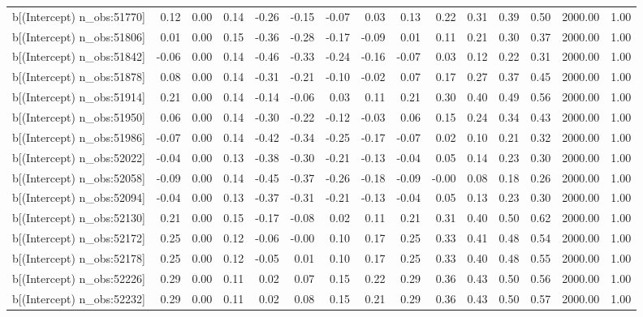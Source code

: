 \begin{table}[ht]
\begin{tabular}{rrrrrrrrrrrrrrr}
  b[(Intercept) n\_obs:51770] & 0.12 & 0.00 & 0.14 & -0.26 & -0.15 & -0.07 & 0.03 & 0.13 & 0.22 & 0.31 & 0.39 & 0.50 & 2000.00 & 1.00 \\ 
  b[(Intercept) n\_obs:51806] & 0.01 & 0.00 & 0.15 & -0.36 & -0.28 & -0.17 & -0.09 & 0.01 & 0.11 & 0.21 & 0.30 & 0.37 & 2000.00 & 1.00 \\ 
  b[(Intercept) n\_obs:51842] & -0.06 & 0.00 & 0.14 & -0.46 & -0.33 & -0.24 & -0.16 & -0.07 & 0.03 & 0.12 & 0.22 & 0.31 & 2000.00 & 1.00 \\ 
  b[(Intercept) n\_obs:51878] & 0.08 & 0.00 & 0.14 & -0.31 & -0.21 & -0.10 & -0.02 & 0.07 & 0.17 & 0.27 & 0.37 & 0.45 & 2000.00 & 1.00 \\ 
  b[(Intercept) n\_obs:51914] & 0.21 & 0.00 & 0.14 & -0.14 & -0.06 & 0.03 & 0.11 & 0.21 & 0.30 & 0.40 & 0.49 & 0.56 & 2000.00 & 1.00 \\ 
  b[(Intercept) n\_obs:51950] & 0.06 & 0.00 & 0.14 & -0.30 & -0.22 & -0.12 & -0.03 & 0.06 & 0.15 & 0.24 & 0.34 & 0.43 & 2000.00 & 1.00 \\ 
  b[(Intercept) n\_obs:51986] & -0.07 & 0.00 & 0.14 & -0.42 & -0.34 & -0.25 & -0.17 & -0.07 & 0.02 & 0.10 & 0.21 & 0.32 & 2000.00 & 1.00 \\ 
  b[(Intercept) n\_obs:52022] & -0.04 & 0.00 & 0.13 & -0.38 & -0.30 & -0.21 & -0.13 & -0.04 & 0.05 & 0.14 & 0.23 & 0.30 & 2000.00 & 1.00 \\ 
  b[(Intercept) n\_obs:52058] & -0.09 & 0.00 & 0.14 & -0.45 & -0.37 & -0.26 & -0.18 & -0.09 & -0.00 & 0.08 & 0.18 & 0.26 & 2000.00 & 1.00 \\ 
  b[(Intercept) n\_obs:52094] & -0.04 & 0.00 & 0.13 & -0.37 & -0.31 & -0.21 & -0.13 & -0.04 & 0.05 & 0.13 & 0.23 & 0.30 & 2000.00 & 1.00 \\ 
  b[(Intercept) n\_obs:52130] & 0.21 & 0.00 & 0.15 & -0.17 & -0.08 & 0.02 & 0.11 & 0.21 & 0.31 & 0.40 & 0.50 & 0.62 & 2000.00 & 1.00 \\ 
  b[(Intercept) n\_obs:52172] & 0.25 & 0.00 & 0.12 & -0.06 & -0.00 & 0.10 & 0.17 & 0.25 & 0.33 & 0.41 & 0.48 & 0.54 & 2000.00 & 1.00 \\ 
  b[(Intercept) n\_obs:52178] & 0.25 & 0.00 & 0.12 & -0.05 & 0.01 & 0.10 & 0.17 & 0.25 & 0.33 & 0.40 & 0.48 & 0.55 & 2000.00 & 1.00 \\ 
  b[(Intercept) n\_obs:52226] & 0.29 & 0.00 & 0.11 & 0.02 & 0.07 & 0.15 & 0.22 & 0.29 & 0.36 & 0.43 & 0.50 & 0.56 & 2000.00 & 1.00 \\ 
  b[(Intercept) n\_obs:52232] & 0.29 & 0.00 & 0.11 & 0.02 & 0.08 & 0.15 & 0.21 & 0.29 & 0.36 & 0.43 & 0.50 & 0.57 & 2000.00 & 1.00 \\ 

\end{tabular}
\end{table}

